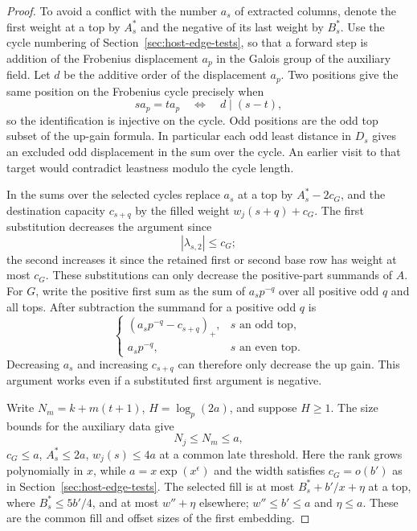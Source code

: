 \begin{proof}

To avoid a conflict
with the number \(a_s\) of extracted columns, denote the first
weight at a top by \(A_s^*\) and the negative of its last weight
by \(B_s^*\). Use the cycle numbering of
Section~\ref{sec:host-edge-tests}, so that a forward step is
addition of the Frobenius displacement \(a_p\) in the Galois group of the auxiliary field.
Let \(d\) be the additive order of the displacement \(a_p\). Two positions give the same position on the Frobenius cycle precisely when
\[
  s a_p=t a_p\quad\Longleftrightarrow\quad d\mid(s-t),
\]
so the identification is injective on the cycle. Odd positions
are the odd top subset of the up-gain formula. In particular
each odd least distance in \(D_s\) gives an excluded odd
displacement in the sum over the cycle. An earlier visit to that
target would contradict leastness modulo the cycle length.


In the sums over the selected cycles replace \(a_s\) at a top by
\(A_s^*-2c_G\), and the destination capacity \(c_{s+q}\)
by the filled weight \(w_j(s+q)+c_G\). The first substitution
decreases the argument since 
\[
  |\lambda_{s,2}|\le c_G;
\]
the second increases it since the retained first or second
base row has weight at most \(c_G\). These substitutions
can only decrease the positive-part summands of \(A\).
For \(G\), write the positive first sum as the sum of
\(a_s p^{-q}\) over all positive odd \(q\) and all tops.
After subtraction the summand for a positive odd \(q\) is
\[
  \begin{cases}
      (a_s p^{-q}-c_{s+q})_+, & s\text{ an odd top},\\
      a_s p^{-q}, & s\text{ an even top}.
  \end{cases}
\]
Decreasing \(a_s\) and increasing \(c_{s+q}\) can therefore only
decrease the up gain. This argument works even if a substituted first
argument is negative.


Write \(N_m=k+m(t+1)\), \(H=\log_p(2a)\), and suppose
\(H\ge1\). The size bounds for the auxiliary data give 
\[
  N_j\le N_m\le a,
\]
\(c_G\le a\), \(A_s^*\le2a\), \(w_j(s)\le4a\)
at a common late threshold. Here the rank grows polynomially in \(x\), while
\(a=x\exp(x^\epsilon)\) and the width satisfies \(c_G=o(b')\)
as in Section~\ref{sec:host-edge-tests}. The selected fill is at most
\(B_s^*+b'/x+\eta\) at a top, where \(B_s^*\le5b'/4\),
and at most \(w''+\eta\) elsewhere; \(w''\le b'\le a\)
and \(\eta\le a\). These are the common fill and offset sizes
of the first embedding.


\end{proof}
